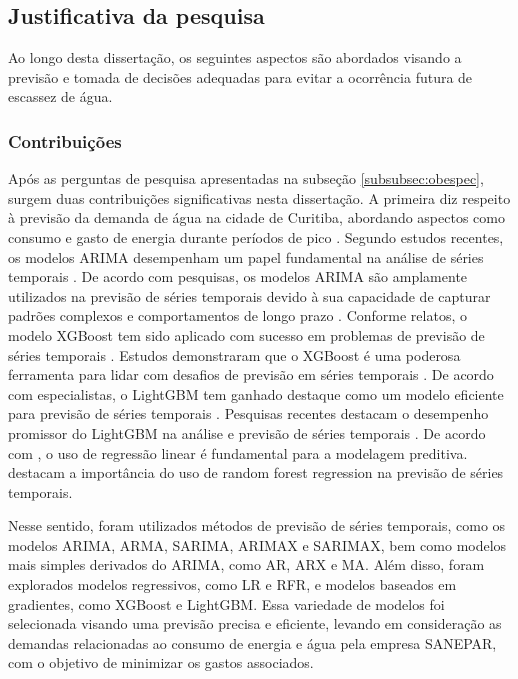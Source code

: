 \subsection{Justificativa da pesquisa} \label{subsec:justif}

Ao longo desta dissertação, os seguintes aspectos são abordados visando a previsão e tomada de decisões adequadas para evitar a ocorrência futura de escassez de água.

\subsubsection{Contribui\c c\~oes} \label{subsubsec:Contribuição}

Após as perguntas de pesquisa apresentadas na subseção \ref{subsubsec:obespec}, surgem duas contribuições significativas nesta dissertação. A primeira diz respeito à previsão da demanda de água na cidade de Curitiba, abordando aspectos como consumo e gasto de energia durante períodos de pico \cite{arima_python} \cite{xgboost_intro}. Segundo estudos recentes, os modelos ARIMA desempenham um papel fundamental na análise de séries temporais \cite{arima_python}. De acordo com pesquisas, os modelos ARIMA são amplamente utilizados na previsão de séries temporais devido à sua capacidade de capturar padrões complexos e comportamentos de longo prazo \cite{arima_python}. Conforme relatos, o modelo XGBoost tem sido aplicado com sucesso em problemas de previsão de séries temporais \cite{xgboost_intro}. Estudos demonstraram que o XGBoost é uma poderosa ferramenta para lidar com desafios de previsão em séries temporais \cite{xgboost_intro}. De acordo com especialistas, o LightGBM tem ganhado destaque como um modelo eficiente para previsão de séries temporais \cite{lightgbm_forecasting}. Pesquisas recentes destacam o desempenho promissor do LightGBM na análise e previsão de séries temporais \cite{lightgbm_forecasting}. De acordo com , o uso de regressão linear é fundamental para a modelagem preditiva.  destacam a importância do uso de random forest regression na previsão de séries temporais.

Nesse sentido, foram utilizados métodos de previsão de séries temporais, como os modelos ARIMA, ARMA, SARIMA, ARIMAX e SARIMAX, bem como modelos mais simples derivados do ARIMA, como AR, ARX e MA. Além disso, foram explorados modelos regressivos, como LR e RFR, e modelos baseados em gradientes, como XGBoost e LightGBM. Essa variedade de modelos foi selecionada visando uma previsão precisa e eficiente, levando em consideração as demandas relacionadas ao consumo de energia e água pela empresa SANEPAR, com o objetivo de minimizar os gastos associados.

